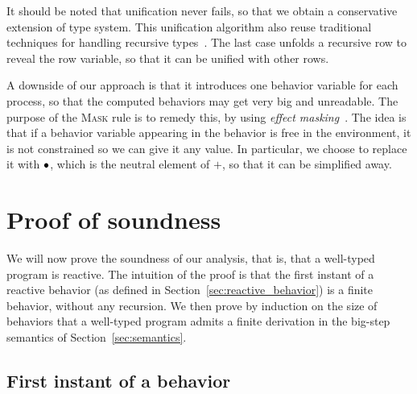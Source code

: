 \documentclass[9pt,preprint]{sigplanconf}
\begin{document}
%
It should be noted that unification never fails, so that we obtain a conservative extension of \rml type system. This unification algorithm also reuse traditional techniques for handling recursive types~\cite{Huet:1975}. The last case unfolds a recursive row to reveal the row variable, so that it can be unified with other rows. 

A downside of our approach is that it introduces one behavior variable for each process, so that the computed behaviors may get very big and unreadable. The purpose of the \textsc{Mask} rule is to remedy this, by using \emph{effect masking}~\cite{Lucassen:1988}. The idea is that if a behavior variable appearing in the behavior is free in the environment, it is not constrained so we can give it any value. In particular, we choose to replace it with $\bullet$, which is the neutral element of $+$, so that it can be simplified away.


\section{Proof of soundness}
\label{sec:soundness}

We will now prove the soundness of our analysis, that is, that a well-typed program is reactive. The intuition of the proof is that the first instant of a reactive behavior (as defined in Section~\ref{sec:reactive_behavior}) is a finite behavior, without any recursion. We then prove by induction on the size of behaviors that a well-typed program admits a finite derivation in the big-step semantics of Section~\ref{sec:semantics}.

\subsection{First instant of a behavior}
\end{document}
